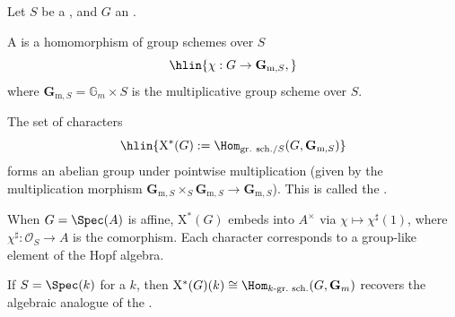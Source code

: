\begin{definition} \label{definition:character_of_an_affine_algebraic_group_scheme_over_a_scheme}

    Let $S$ be a , and $G$ an .

    A  is a homomorphism of group schemes over $S$
    $$\hlin{\chi : G \to \mathbf{G}_{\mathrm{m},S},}$$
    where $\mathbf{G}_{\mathrm{m},S} = \mathbb{G}_m \times S$ is the multiplicative group scheme over $S$.

    The set of characters
    $$\hlin{\mathrm{X}^*(G) := \Hom_{\mathrm{gr.\ sch./}S}(G, \mathbf{G}_{\mathrm{m},S})}$$
    forms an abelian group under pointwise multiplication (given by the multiplication morphism $\mathbf{G}_{\mathrm{m},S} \times_S \mathbf{G}_{\mathrm{m},S} \to \mathbf{G}_{\mathrm{m},S}$). This is called the .

    When $G = \Spec(A)$ is affine, $\mathrm{X}^*(G)$ embeds into $A^\times$ via $\chi \mapsto \chi^\sharp(1)$, where $\chi^\sharp: \mathcal{O}_S \to A$ is the comorphism. Each character corresponds to a group-like element of the Hopf algebra.

    If $S = \Spec(k)$ for a  $k$, then $\mathrm{X}^*(G)(k) \cong \Hom_{k\text{-gr.\ sch.}}(G, \mathbf{G}_m)$ recovers the algebraic analogue of the .
\end{definition}
